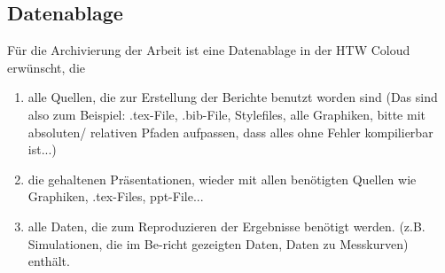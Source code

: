 \subsection{Datenablage}
Für die Archivierung der Arbeit ist eine Datenablage in der HTW Coloud erwünscht, die 

\begin{enumerate}
\item alle Quellen, die zur Erstellung der Berichte benutzt worden sind (Das sind also zum Beispiel: .tex-File, .bib-File, Stylefiles, alle Graphiken, bitte mit absoluten/ relativen Pfaden aufpassen, dass alles ohne Fehler kompilierbar ist...)
\item die gehaltenen Präsentationen, wieder mit allen benötigten Quellen wie Graphiken, .tex-Files, ppt-File...
\item alle Daten, die zum Reproduzieren der Ergebnisse benötigt werden. (z.B. Simulationen, die im Be-richt gezeigten Daten, Daten zu Messkurven)
enthält.
\end{enumerate}